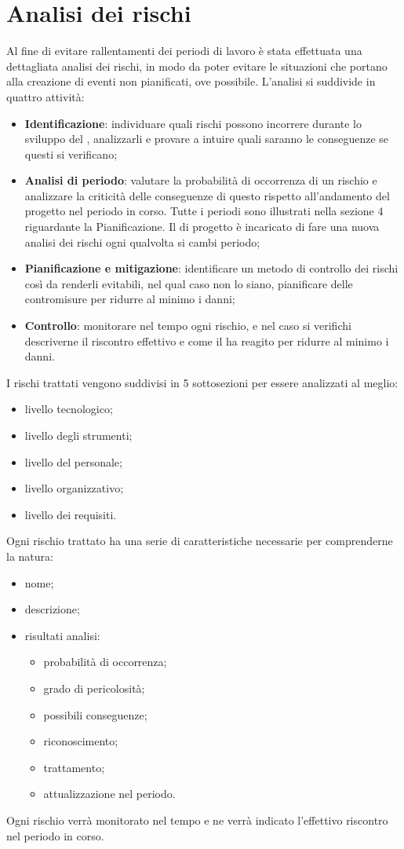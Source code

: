 \documentclass[PianoDiProgetto.tex]{subfiles}
\begin{document}
\section{Analisi dei rischi}
Al fine di evitare rallentamenti dei periodi di lavoro è stata effettuata una dettagliata analisi dei rischi, in modo da poter evitare le situazioni che portano alla creazione di eventi non pianificati, ove possibile. L'analisi si suddivide in quattro attività:
	\begin{itemize}
		\item \textbf{Identificazione}: individuare quali rischi possono incorrere durante lo sviluppo del , analizzarli e provare a intuire quali saranno le conseguenze se questi si verificano;
		\item \textbf{Analisi di periodo}: valutare la probabilità di occorrenza di un rischio e analizzare la criticità delle conseguenze di questo rispetto all'andamento del progetto nel periodo in corso. Tutte i periodi sono illustrati nella sezione 4 riguardante la Pianificazione. Il \RESP{} di progetto è incaricato  di fare una nuova analisi dei rischi ogni qualvolta si cambi periodo;
		\item \textbf{Pianificazione e mitigazione}: identificare un metodo di controllo dei rischi così da renderli evitabili, nel qual caso non lo siano, pianificare delle contromisure per ridurre al minimo i danni;
		\item \textbf{Controllo}: monitorare nel tempo ogni rischio, e nel caso si verifichi descriverne il riscontro effettivo e come il  ha reagito per ridurre al minimo i danni.
	\end{itemize}
I rischi trattati vengono suddivisi in 5 sottosezioni per essere analizzati al meglio:
	\begin{itemize}
		\item livello tecnologico;
		\item livello degli strumenti;
		\item livello del personale;
		\item livello organizzativo;
		\item livello dei requisiti.
	\end{itemize}
Ogni rischio trattato ha una serie di caratteristiche necessarie per comprenderne la natura:
	\begin{itemize}
		\item nome;
		\item descrizione;
		\item risultati analisi:
			\begin{itemize}
				\item probabilità di occorrenza;
				\item grado di pericolosità;
				\item possibili conseguenze;
				\item riconoscimento;
				\item trattamento;
				\item attualizzazione nel periodo.
			\end{itemize}
	\end{itemize}
Ogni rischio verrà monitorato nel tempo e ne verrà indicato l'effettivo riscontro nel periodo in corso.
\end{document}
